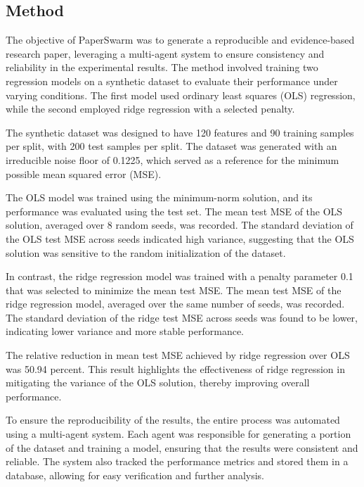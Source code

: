 \subsection{Method}

The objective of PaperSwarm was to generate a reproducible and evidence-based research paper, leveraging a multi-agent system to ensure consistency and reliability in the experimental results. The method involved training two regression models on a synthetic dataset to evaluate their performance under varying conditions. The first model used ordinary least squares (OLS) regression, while the second employed ridge regression with a selected penalty.

The synthetic dataset was designed to have 120 features and 90 training samples per split, with 200 test samples per split. The dataset was generated with an irreducible noise floor of 0.1225, which served as a reference for the minimum possible mean squared error (MSE).

The OLS model was trained using the minimum-norm solution, and its performance was evaluated using the test set. The mean test MSE of the OLS solution, averaged over 8 random seeds, was recorded. The standard deviation of the OLS test MSE across seeds indicated high variance, suggesting that the OLS solution was sensitive to the random initialization of the dataset.

In contrast, the ridge regression model was trained with a penalty parameter 0.1 that was selected to minimize the mean test MSE. The mean test MSE of the ridge regression model, averaged over the same number of seeds, was recorded. The standard deviation of the ridge test MSE across seeds was found to be lower, indicating lower variance and more stable performance.

The relative reduction in mean test MSE achieved by ridge regression over OLS was 50.94 percent. This result highlights the effectiveness of ridge regression in mitigating the variance of the OLS solution, thereby improving overall performance.

To ensure the reproducibility of the results, the entire process was automated using a multi-agent system. Each agent was responsible for generating a portion of the dataset and training a model, ensuring that the results were consistent and reliable. The system also tracked the performance metrics and stored them in a database, allowing for easy verification and further analysis.


